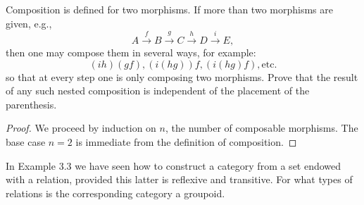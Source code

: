 \newpage
\begin{tcolorbox}[title=Problem 1, breakable] 
    Composition is defined for two morphisms. If more than two morphisms are given, e.g.,
    \[A \xrightarrow{f} B \xrightarrow{g} C \xrightarrow{h} D \xrightarrow{i} E,\]
    then one may compose them in several ways, for example:
    \[(ih)(gf), (i(hg))f, (i(hg)f), \text{etc.}\]
    so that at every step one is only composing two morphisms. Prove that 
    the result of any such nested composition is independent of the placement of the 
    parenthesis.
\end{tcolorbox}

\begin{proof}
    We proceed by induction on $n$, the number of composable morphisms.
    The base case $n = 2$ is immediate from the definition of composition.
\end{proof}

\begin{tcolorbox}[title=Problem 2, breakable] 
    In Example 3.3 we have seen how to construct  a category from a set endowed with a relation,
    provided this latter is reflexive and transitive. For what types of  relations is the 
    corresponding category a groupoid.
\end{tcolorbox}